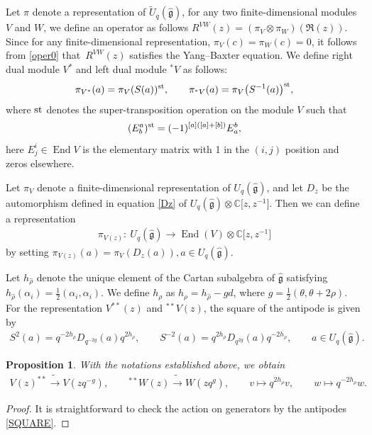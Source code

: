 \documentclass[10pt,a4paper]{amsart}
\numberwithin{equation}{section}
\newtheorem{Proposition}[Theorem]{Proposition}
 { \theoremstyle{definition}
\newtheorem{Definition}[Theorem]{Definition}
\newtheorem{Note}[Theorem]{Note}
\newtheorem{Example}[Theorem]{Example}
\newtheorem{Remark}[Theorem]{Remark} }
\begin{document}
Let $\pi$ denote a representation of $\widetilde{U}_q(\mathfrak{\hat{g}})$, for any two finite-dimensional modules $V$ and $W$, we define an operator as follows
$
R^{VW}(z)=(\pi_V\otimes\pi_W)(\mathfrak{R}(z))$.
Since for any finite-dimensional representation, $\pi_V(c)=\pi_W(c)=0$, it follows from \eqref{oper0} that~$R^{VW}(z)$ satisfies the Yang--Baxter equation.
We define right dual module $V^\ast$ and left dual module $^\ast V$ as follows:
\begin{gather*}
 \pi_{V^\ast}(a)=\pi_V(S(a))^{\rm st},\qquad \pi_{^\ast V}(a)=\pi_V\bigl(S^{-1}(a)\bigr)^{\rm st},
\end{gather*}
where ${\rm st}$ denotes the super-transposition operation on the module $V$ such that
\[(E^{a}_b)^{\rm st}=(-1)^{[a]([a]+[b])}E^{b}_a,
\]
here $E^{i}_j\in \operatorname{End}V$ is the elementary matrix with 1 in the $(i,j)$ position and zeros elsewhere.



Let $\pi_V$ denote a finite-dimensional representation of $U_q(\mathfrak{\hat{g}})$, and let $D_z$ be the automorphism defined in equation \eqref{Dz} of $U_q(\mathfrak{\hat{g}})\otimes\mathbb{C}\bigl[z, z^{-1}\bigr]$. Then we can define a representation
\begin{gather*}
 \pi_{V(z)}\colon\ U_q(\mathfrak{\hat{g}})\rightarrow \operatorname{End}(V)\otimes\mathbb{C}\bigl[z, z^{-1}\bigr]
\end{gather*}
by setting $\pi_{V(z)}(a)=\pi_{V}(D_z(a)), a\in U_q(\mathfrak{\hat{g}})$.


Let $h_{\hat{\rho}}$ denote the unique element of the Cartan subalgebra of $\mathfrak{\hat{g}}$ satisfying $h_{\hat{\rho}}(\alpha_i)=\frac{1}{2}(\alpha_i, \alpha_i)$. We define $h_\rho$ as
$
 h_\rho=h_{\hat{\rho}}-gd$,
where $g=\frac{1}{2}(\theta, \theta+2\rho)$.
For the representation $V^{\ast\ast}(z)$ and $^{\ast\ast}V(z)$, the square of the antipode is given by
\begin{gather}\label{SQUARE}
 S^2(a)=q^{-2h_{\rho}}D_{q^{-2g}}(a)q^{2h_{\rho}}, \qquad S^{-2}(a)=q^{2h_{\rho}}D_{q^{2g}}(a)q^{-2h_{\rho}},\qquad a\in U_q(\mathfrak{\hat{g}}).
\end{gather}

\begin{Proposition} With the notations established above, we obtain
 \begin{gather*}
 V(z)^{\ast\ast}\tilde{\rightarrow}V(zq^{-g}), \qquad ^{\ast\ast}W(z)\tilde{\rightarrow}W(zq^{g}), \qquad v\mapsto q^{2h_\rho}v, \qquad w\mapsto q^{-2h_\rho}w.
 \end{gather*}
\end{Proposition}
\begin{proof}
It is straightforward to check the action on generators by the antipodes \eqref{SQUARE}.
\end{proof}
\end{document}
